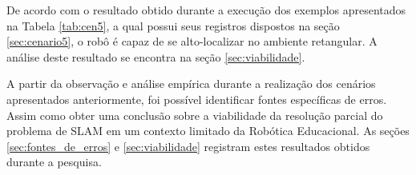 De acordo com o resultado obtido durante a execução dos exemplos apresentados na Tabela \ref{tab:cen5}, a qual possui seus registros
dispostos na seção \ref{sec:cenario5}, o robô é capaz de se alto-localizar no ambiente retangular. A análise deste resultado se encontra
na seção \ref{sec:viabilidade}.

A partir da observação e análise empírica durante a realização dos cenários apresentados anteriormente, foi possível identificar
fontes específicas de erros. Assim como obter uma conclusão sobre a viabilidade da resolução parcial do problema de SLAM em um contexto
limitado da Robótica Educacional. As seções \ref{sec:fontes_de_erros} e \ref{sec:viabilidade} registram estes resultados obtidos durante
a pesquisa.
